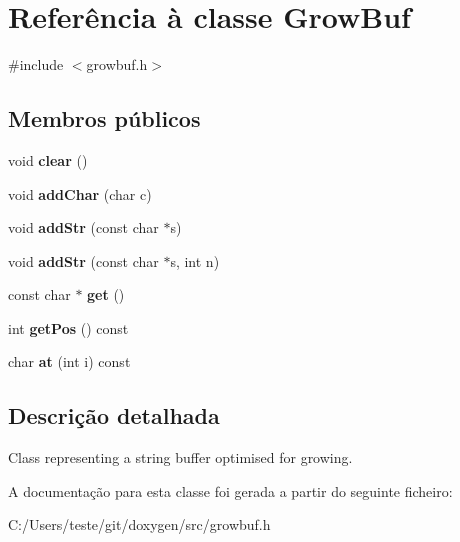 \hypertarget{class_grow_buf}{\section{Referência à classe Grow\-Buf}
\label{class_grow_buf}
}


{\ttfamily \#include $<$growbuf.\-h$>$}

\subsection*{Membros públicos}
\begin{DoxyCompactItemize}
\item 
\hypertarget{class_grow_buf_ac8bb3912a3ce86b15842e79d0b421204}{void {\bfseries clear} ()}\label{class_grow_buf_ac8bb3912a3ce86b15842e79d0b421204}

\item 
\hypertarget{class_grow_buf_a2526ae572a2d9b53c8cf2f1feeacfdf5}{void {\bfseries add\-Char} (char c)}\label{class_grow_buf_a2526ae572a2d9b53c8cf2f1feeacfdf5}

\item 
\hypertarget{class_grow_buf_a0b2677964a704d3fc789f92ba01510a3}{void {\bfseries add\-Str} (const char $\ast$s)}\label{class_grow_buf_a0b2677964a704d3fc789f92ba01510a3}

\item 
\hypertarget{class_grow_buf_af79f48e01a81308676f3ea749b5d54bc}{void {\bfseries add\-Str} (const char $\ast$s, int n)}\label{class_grow_buf_af79f48e01a81308676f3ea749b5d54bc}

\item 
\hypertarget{class_grow_buf_a6e9f5186c82a9aadd0b1357123d84a18}{const char $\ast$ {\bfseries get} ()}\label{class_grow_buf_a6e9f5186c82a9aadd0b1357123d84a18}

\item 
\hypertarget{class_grow_buf_a7ab481e63e608f9919d5aad5ed176f1d}{int {\bfseries get\-Pos} () const }\label{class_grow_buf_a7ab481e63e608f9919d5aad5ed176f1d}

\item 
\hypertarget{class_grow_buf_ac00c40980488626b822239930c521124}{char {\bfseries at} (int i) const }\label{class_grow_buf_ac00c40980488626b822239930c521124}

\end{DoxyCompactItemize}


\subsection{Descrição detalhada}
Class representing a string buffer optimised for growing. 

A documentação para esta classe foi gerada a partir do seguinte ficheiro\-:\begin{DoxyCompactItemize}
\item 
C\-:/\-Users/teste/git/doxygen/src/growbuf.\-h\end{DoxyCompactItemize}
